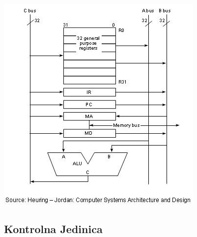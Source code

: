 \documentclass[12p,a4paper]{article}
\begin{document}
\begin{multicols}{2}
    \includegraphics[width=\columnwidth]{Figures/3bus_datapath.jpg}

    \subsection{Kontrolna Jedinica}


\end{multicols}
\end{document}
